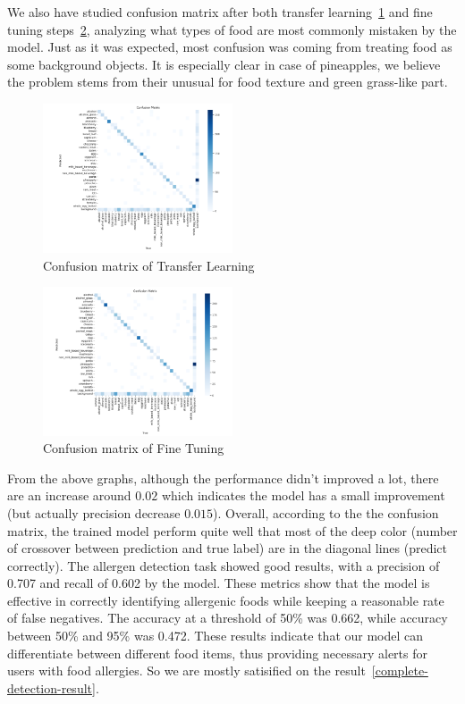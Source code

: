 \documentclass[10pt,twocolumn,letterpaper]{article}
\begin{document}
We also have studied confusion matrix after both transfer learning~\ref{transfer-learning-confusion} and fine tuning steps~\ref{fine-tuning-confusion}, analyzing what types of food are most commonly mistaken by the model.
Just as it was expected, most confusion was coming from treating food as some background objects.
It is especially clear in case of pineapples, we believe the problem stems from their unusual for food texture and green grass-like part.

\begin{figure}[htbp]
    \centering
    \includegraphics[width=0.5\textwidth]{4471_transfer_confusion.png}
    \caption{Confusion matrix of Transfer Learning}\label{transfer-learning-confusion}
\end{figure}
\begin{figure}[htbp]
    \centering
    \includegraphics[width=0.5\textwidth]{4471_finetuning_confusion.png}
    \caption{Confusion matrix of Fine Tuning}\label{fine-tuning-confusion}
\end{figure}

From the above graphs, although the performance didn't improved a lot, there are an increase around $0.02$ which indicates the model has a small improvement (but actually precision decrease $0.015$). 
Overall, according to the the confusion matrix, the trained model perform quite well that most of the deep color (number of crossover between prediction and true label) are in the diagonal lines (predict correctly). 
The allergen detection task showed good results, with a precision of 0.707 and recall of 0.602 by the model.
These metrics show that the model is effective in correctly identifying allergenic foods while keeping a reasonable rate of false negatives.
The accuracy at a threshold of 50\% was 0.662, while accuracy between 50\% and 95\% was 0.472.
These results indicate that our model can differentiate between different food items, thus providing necessary alerts for users with food allergies.
So we are mostly satisified on the result~\ref{complete-detection-result}.
\end{document}
